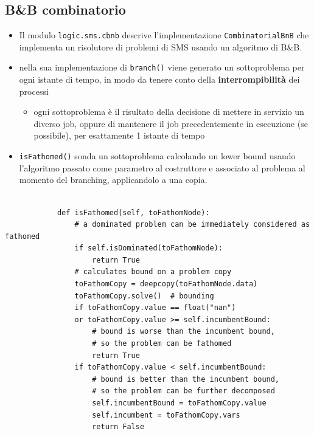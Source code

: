 \documentclass[compress]{beamer}
\begin{document}
    \subsection{B\&B combinatorio}
    \begin{frame}[fragile]{\subsecname}
        \begin{itemize}
            \item Il modulo \texttt{logic.sms.cbnb} descrive l'implementazione \texttt{CombinatorialBnB}
            che implementa un risolutore di problemi di SMS usando un algoritmo di B\&B.
            \item nella sua implementazione di \texttt{branch()} viene generato un sottoproblema per
            ogni istante di tempo, in modo da tenere conto della \textbf{interrompibilità} dei processi
            \begin{itemize}
                \item ogni sottoproblema è il risultato della decisione di mettere in servizio
                un diverso job, oppure di mantenere il job precedentemente in esecuzione (se possibile),
                per esattamente 1 istante di tempo
            \end{itemize}
        \end{itemize}
    \end{frame}
    \begin{frame}[fragile]{\subsecname}
        \begin{itemize}
            \item  \texttt{isFathomed()} sonda
            un sottoproblema calcolando un lower bound usando l'algoritmo passato come
            parametro al costruttore e associato al problema al momento del branching,
            applicandolo a una copia.
        \end{itemize}
        \begin{verbatim}
                                                    
            def isFathomed(self, toFathomNode):
                # a dominated problem can be immediately considered as fathomed
                if self.isDominated(toFathomNode):
                    return True
                # calculates bound on a problem copy
                toFathomCopy = deepcopy(toFathomNode.data)
                toFathomCopy.solve()  # bounding
                if toFathomCopy.value == float("nan")
                or toFathomCopy.value >= self.incumbentBound: 
                    # bound is worse than the incumbent bound,
                    # so the problem can be fathomed
                    return True
                if toFathomCopy.value < self.incumbentBound:
                    # bound is better than the incumbent bound,
                    # so the problem can be further decomposed
                    self.incumbentBound = toFathomCopy.value
                    self.incumbent = toFathomCopy.vars
                    return False
        \end{verbatim} 
    \end{frame}
\end{document}
